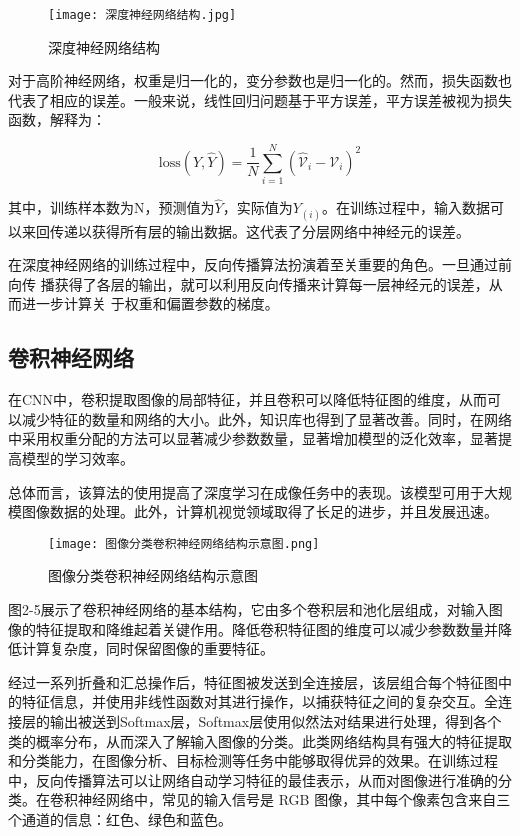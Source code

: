\begin{figure}[hbt]
	\centering
	\texttt{[image: 深度神经网络结构.jpg]}
	\caption{深度神经网络结构}
	\label{f.example}
\end{figure}

对于高阶神经网络，权重是归一化的，变分参数也是归一化的。然而，损失函数也代表了相应的误差。一般来说，线性回归问题基于平方误差，平方误差被视为损失函数，解释为：

\[
\text{loss}(Y, \hat{Y}) = \frac{1}{N} \sum_{i=1}^{N} \left( \hat{\mathcal{V}}_i - \mathcal{V}_i \right)^2
\]

其中，训练样本数为N，预测值为$\hat{Y}$，实际值为$Y_(i)$。在训练过程中，输入数据可以来回传递以获得所有层的输出数据。这代表了分层网络中神经元的误差。

在深度神经网络的训练过程中，反向传播算法扮演着至关重要的角色。一旦通过前向传
播获得了各层的输出，就可以利用反向传播来计算每一层神经元的误差，从而进一步计算关
于权重和偏置参数的梯度。

\subsection{卷积神经网络}

在CNN中，卷积提取图像的局部特征，并且卷积可以降低特征图的维度，从而可以减少特征的数量和网络的大小。此外，知识库也得到了显著改善。同时，在网络中采用权重分配的方法可以显著减少参数数量，显著增加模型的泛化效率，显著提高模型的学习效率。

总体而言，该算法的使用提高了深度学习在成像任务中的表现。该模型可用于大规模图像数据的处理。此外，计算机视觉领域取得了长足的进步，并且发展迅速。

\begin{figure}[hbt]
	\centering
	\texttt{[image: 图像分类卷积神经网络结构示意图.png]}
	\caption{图像分类卷积神经网络结构示意图}
	\label{f.example}
\end{figure}

图2-5展示了卷积神经网络的基本结构，它由多个卷积层和池化层组成，对输入图像的特征提取和降维起着关键作用。降低卷积特征图的维度可以减少参数数量并降低计算复杂度，同时保留图像的重要特征。

经过一系列折叠和汇总操作后，特征图被发送到全连接层，该层组合每个特征图中的特征信息，并使用非线性函数对其进行操作，以捕获特征之间的复杂交互。全连接层的输出被送到Softmax层，Softmax层使用似然法对结果进行处理，得到各个类的概率分布，从而深入了解输入图像的分类。此类网络结构具有强大的特征提取和分类能力，在图像分析、目标检测等任务中能够取得优异的效果。在训练过程中，反向传播算法可以让网络自动学习特征的最佳表示，从而对图像进行准确的分类。在卷积神经网络中，常见的输入信号是 RGB 图像，其中每个像素包含来自三个通道的信息：红色、绿色和蓝色。

